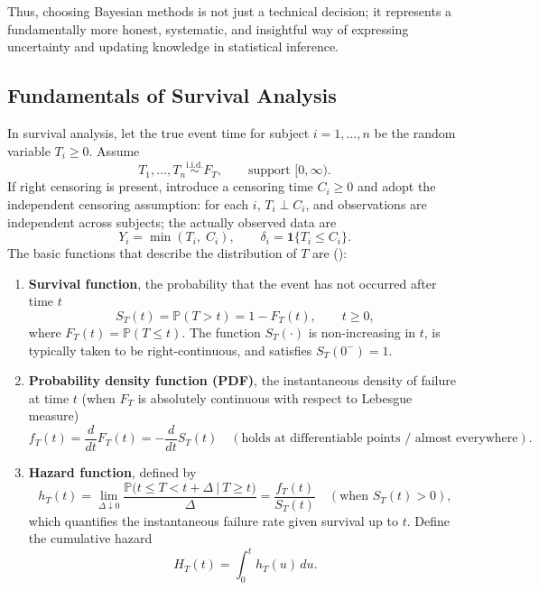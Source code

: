 Thus, choosing Bayesian methods is not just a technical decision; it represents a fundamentally more honest, systematic, and insightful way of expressing uncertainty and updating knowledge in statistical inference.






\subsection{Fundamentals of Survival Analysis} \label{Fundamentals of Survival Analysis}

In survival analysis, let the true event time for subject $i=1,\dots,n$ be the random variable $T_i\ge 0$. Assume
$$
T_1,\ldots,T_n \stackrel{\text{i.i.d.}}{\sim} F_T,\qquad \text{support }[0,\infty).
$$
If right censoring is present, introduce a censoring time $C_i\ge 0$ and adopt the independent censoring assumption: for each $i$, $T_i\perp C_i$, and observations are independent across subjects; the actually observed data are
$$
Y_i=\min(T_i,\;C_i),\qquad \delta_i=\mathbf 1\{T_i\le C_i\}.
$$
The basic functions that describe the distribution of $T$ are (\cite{kleinbaum1996survival}):
\begin{enumerate}
    \item \textbf{Survival function}, the probability that the event has not occurred after time $t$
   \begin{equation}
       S_T(t)=\mathbb P(T>t)=1-F_T(t),\qquad t\ge 0,
   \end{equation}
   where $F_T(t)=\mathbb P(T\le t)$. The function $S_T(\cdot)$ is non-increasing in $t$, is typically taken to be right-continuous, and satisfies $S_T(0^-)=1$.
   \item \textbf{Probability density function (PDF)}, the instantaneous density of failure at time $t$ (when $F_T$ is absolutely continuous with respect to Lebesgue measure)
   \begin{equation}
        f_T(t)=\frac{d}{dt}F_T(t)=-\frac{d}{dt}S_T(t)\quad(\text{holds at differentiable points / almost everywhere}).
   \end{equation}
   \item \textbf{Hazard function}, defined by
   \begin{equation}
        h_T(t)=\lim_{\Delta\downarrow 0}\frac{\mathbb P\big(t\le T<t+\Delta\ \big|\ T\ge t\big)}{\Delta}
          =\frac{f_T(t)}{S_T(t)}\quad(\text{when }S_T(t)>0),
   \end{equation}
   which quantifies the instantaneous failure rate given survival up to $t$. Define the cumulative hazard \begin{equation}
       H_T(t)=\int_0^{t} h_T(u)\,du.
   \end{equation}
\end{enumerate}

